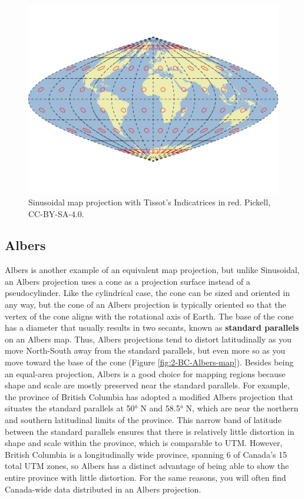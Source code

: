 \documentclass[
]{book}
\begin{document}
\begin{figure}
\includegraphics[width=0.75\linewidth]{images/02-Sinusoidal-map} \caption{Sinusoidal map projection with Tissot's Indicatrices in red. Pickell, CC-BY-SA-4.0.}\label{fig:2-Sinusoidal-map}
\end{figure}

\hypertarget{albers}{%
\subsection{Albers}\label{albers}}

Albers is another example of an equivalent map projection, but unlike Sinusoidal, an Albers projection uses a cone as a projection surface instead of a pseudocylinder. Like the cylindrical case, the cone can be sized and oriented in any way, but the cone of an Albers projection is typically oriented so that the vertex of the cone aligns with the rotational axis of Earth. The base of the cone has a diameter that usually results in two secants, known as \textbf{standard parallels} on an Albers map. Thus, Albers projections tend to distort latitudinally as you move North-South away from the standard parallels, but even more so as you move toward the base of the cone (Figure \ref{fig:2-BC-Albers-map}). Besides being an equal-area projection, Albers is a good choice for mapping regions because shape and scale are mostly preserved near the standard parallels. For example, the province of British Columbia has adopted a modified Albers projection that situates the standard parallels at 50° N and 58.5° N, which are near the northern and southern latitudinal limits of the province. This narrow band of latitude between the standard parallels ensures that there is relatively little distortion in shape and scale within the province, which is comparable to UTM. However, British Columbia is a longitudinally wide province, spanning 6 of Canada's 15 total UTM zones, so Albers has a distinct advantage of being able to show the entire province with little distortion. For the same reasons, you will often find Canada-wide data distributed in an Albers projection.
\end{document}
